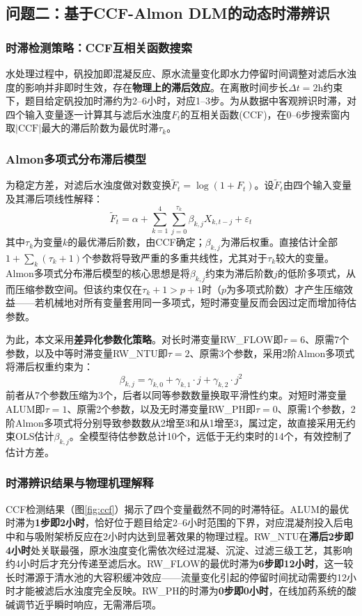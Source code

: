 \documentclass{cumcmthesis}
\begin{document}
\subsection{问题二：基于CCF-Almon DLM的动态时滞辨识}

\subsubsection{时滞检测策略：CCF互相关函数搜索}
水处理过程中，矾投加即混凝反应、原水流量变化即水力停留时间调整对滤后水浊度的影响并非即时生效，存在\textbf{物理上的滞后效应}。在离散时间步长$\Delta t=2$h约束下，题目给定矾投加时滞约为2--6小时，对应1--3步。为从数据中客观辨识时滞，对四个输入变量逐一计算其与滤后水浊度$F_t$的互相关函数(CCF)，在0--6步搜索窗内取$|\mathrm{CCF}|$最大的滞后阶数为最优时滞$\tau_k$。

\subsubsection{Almon多项式分布滞后模型}
为稳定方差，对滤后水浊度做对数变换$\tilde{F}_t = \log(1+F_t)$。设$\tilde{F}_t$由四个输入变量及其滞后项线性解释：
\begin{equation}
\tilde{F}_t = \alpha + \sum_{k=1}^{4}\sum_{j=0}^{\tau_k} \beta_{k,j} X_{k, t-j} + \varepsilon_t
\end{equation}
其中$\tau_k$为变量$k$的最优滞后阶数，由CCF确定；$\beta_{k,j}$为滞后权重。直接估计全部$1+\sum_k(\tau_k+1)$个参数将导致严重的多重共线性，尤其对于$\tau_k$较大的变量。Almon多项式分布滞后模型的核心思想是将$\beta_{k,j}$约束为滞后阶数$j$的低阶多项式，从而压缩参数空间。但该约束仅在$\tau_k+1>p+1$时（$p$为多项式阶数）才产生压缩效益——若机械地对所有变量套用同一多项式，短时滞变量反而会因过定而增加待估参数。

为此，本文采用\textbf{差异化参数化策略}。对长时滞变量RW\_FLOW即$\tau=6$、原需7个参数，以及中等时滞变量RW\_NTU即$\tau=2$、原需3个参数，采用2阶Almon多项式将滞后权重约束为：
\begin{equation}
\beta_{k,j} = \gamma_{k,0} + \gamma_{k,1}\cdot j + \gamma_{k,2}\cdot j^2
\end{equation}
前者从7个参数压缩为3个，后者以同等参数数量换取平滑性约束。对短时滞变量ALUM即$\tau=1$、原需2个参数，以及无时滞变量RW\_PH即$\tau=0$、原需1个参数，2阶Almon多项式将分别导致参数数从2增至3和从1增至3，属过定，故直接采用无约束OLS估计$\beta_{k,j}$。全模型待估参数总计10个，远低于无约束时的14个，有效控制了估计方差。

\subsubsection{时滞辨识结果与物理机理解释}
CCF检测结果（图\ref{fig:ccf}）揭示了四个变量截然不同的时滞特征。ALUM的最优时滞为\textbf{1步即2小时}，恰好位于题目给定2--6小时范围的下界，对应混凝剂投入后电中和与吸附架桥反应在2小时内达到显著效果的物理过程。RW\_NTU在\textbf{滞后2步即4小时}处关联最强，原水浊度变化需依次经过混凝、沉淀、过滤三级工艺，其影响约4小时后才充分传递至滤后水。RW\_FLOW的最优时滞为\textbf{6步即12小时}，这一较长时滞源于清水池的大容积缓冲效应——流量变化引起的停留时间扰动需要约12小时才能被滤后水浊度完全反映。RW\_PH的时滞为\textbf{0步即0小时}，在线加药系统的酸碱调节近乎瞬时响应，无需滞后项。
\end{document}
